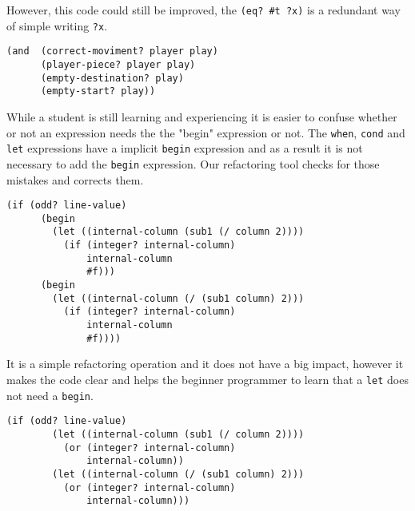 However, this code could still be improved, the {\tt (eq? \#t ?x)} is a redundant way
of simple writing {\tt ?x}.
\begin{lstlisting}[basicstyle=\ttfamily]
(and  (correct-moviment? player play)
      (player-piece? player play)
      (empty-destination? play)
      (empty-start? play))
\end{lstlisting}


While a student is still learning and experiencing it is easier to confuse whether
or not an expression needs the the "begin" expression or not.
The {\tt when}, {\tt cond} and {\tt let} expressions have a implicit {\tt begin} expression and
as a result it is not necessary to add the {\tt begin} expression.
Our refactoring tool checks for those mistakes and corrects them.
\begin{lstlisting}[basicstyle=\ttfamily]
  (if (odd? line-value)
      (begin
        (let ((internal-column (sub1 (/ column 2))))
          (if (integer? internal-column)
              internal-column
              #f)))
      (begin
        (let ((internal-column (/ (sub1 column) 2)))
          (if (integer? internal-column)
              internal-column
              #f))))
\end{lstlisting}
It is a simple refactoring operation and it does not have a big impact, however
it makes the code clear and helps the beginner programmer to learn that a {\tt let}
does not need a {\tt begin}.
\begin{lstlisting}[basicstyle=\ttfamily]
  (if (odd? line-value)
        (let ((internal-column (sub1 (/ column 2))))
          (or (integer? internal-column)
              internal-column))
        (let ((internal-column (/ (sub1 column) 2)))
          (or (integer? internal-column)
              internal-column)))
\end{lstlisting}


